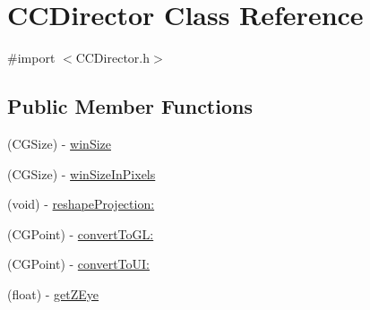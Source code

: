 \hypertarget{class_c_c_director}{\section{C\-C\-Director Class Reference}
\label{class_c_c_director}
}


{\ttfamily \#import $<$C\-C\-Director.\-h$>$}

\subsection*{Public Member Functions}
\begin{DoxyCompactItemize}
\item 
(C\-G\-Size) -\/ \hyperlink{class_c_c_director_aa3dc5b329225586346bd5c7eb6580af0}{win\-Size}
\item 
(C\-G\-Size) -\/ \hyperlink{class_c_c_director_ae0f54cdccd49c700d98948a2b479d373}{win\-Size\-In\-Pixels}
\item 
(void) -\/ \hyperlink{class_c_c_director_a8f9db55b1b757295661bfca2affd776c}{reshape\-Projection\-:}
\item 
(C\-G\-Point) -\/ \hyperlink{class_c_c_director_a8562a991543622122c0d03cace1a70b2}{convert\-To\-G\-L\-:}
\item 
(C\-G\-Point) -\/ \hyperlink{class_c_c_director_ae252d27a1d599548b51efa64e5332e81}{convert\-To\-U\-I\-:}
\item 
\hypertarget{class_c_c_director_ae48fa9a8f27abb11d9e8bb0dd515f835}{(float) -\/ \hyperlink{class_c_c_director_ae48fa9a8f27abb11d9e8bb0dd515f835}{get\-Z\-Eye}}\label{class_c_c_director_ae48fa9a8f27abb11d9e8bb0dd515f835}


\end{DoxyCompactItemize}
